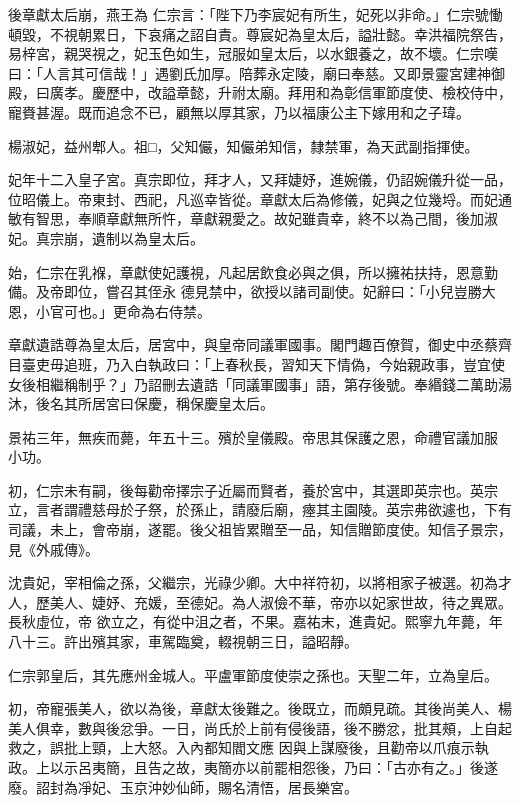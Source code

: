 \begin{pinyinscope}
 後章獻太后崩，燕王為
 仁宗言：「陛下乃李宸妃有所生，妃死以非命。」仁宗號慟頓毀，不視朝累日，下哀痛之詔自責。尊宸妃為皇太后，謚壯懿。幸洪福院祭告，易梓宮，親哭視之，妃玉色如生，冠服如皇太后，以水銀養之，故不壞。仁宗嘆曰：「人言其可信哉！」遇劉氏加厚。陪葬永定陵，廟曰奉慈。又即景靈宮建神御殿，曰廣孝。慶歷中，改謚章懿，升祔太廟。拜用和為彰信軍節度使、檢校侍中，寵賚甚渥。既而追念不已，顧無以厚其家，乃以福康公主下嫁用和之子瑋。



 楊淑妃，益州郫人。祖□，父知儼，知儼弟知信，隸禁軍，為天武副指揮使。



 妃年十二入皇子宮。真宗即位，拜才人，又拜婕妤，進婉儀，仍詔婉儀升從一品，位昭儀上。帝東封、西祀，凡巡幸皆從。章獻太后為修儀，妃與之位幾埒。而妃通敏有智思，奉順章獻無所忤，章獻親愛之。故妃雖貴幸，終不以為己間，後加淑妃。真宗崩，遺制以為皇太后。



 始，仁宗在乳褓，章獻使妃護視，凡起居飲食必與之俱，所以擁祐扶持，恩意勤備。及帝即位，嘗召其侄永
 德見禁中，欲授以諸司副使。妃辭曰：「小兒豈勝大恩，小官可也。」更命為右侍禁。



 章獻遺誥尊為皇太后，居宮中，與皇帝同議軍國事。閣門趣百僚賀，御史中丞蔡齊目臺吏毋追班，乃入白執政曰：「上春秋長，習知天下情偽，今始親政事，豈宜使女後相繼稱制乎？」乃詔刪去遺誥「同議軍國事」語，第存後號。奉緡錢二萬助湯沐，後名其所居宮曰保慶，稱保慶皇太后。



 景祐三年，無疾而薨，年五十三。殯於皇儀殿。帝思其保護之恩，命禮官議加服
 小功。



 初，仁宗未有嗣，後每勸帝擇宗子近屬而賢者，養於宮中，其選即英宗也。英宗立，言者謂禮慈母於子祭，於孫止，請廢后廟，瘞其主園陵。英宗弗欲遽也，下有司議，未上，會帝崩，遂罷。後父祖皆累贈至一品，知信贈節度使。知信子景宗，見《外戚傳》。



 沈貴妃，宰相倫之孫，父繼宗，光祿少卿。大中祥符初，以將相家子被選。初為才人，歷美人、婕妤、充媛，至德妃。為人淑儉不華，帝亦以妃家世故，待之異眾。長秋虛位，帝
 欲立之，有從中沮之者，不果。嘉祐末，進貴妃。熙寧九年薨，年八十三。許出殯其家，車駕臨奠，輟視朝三日，謚昭靜。



 仁宗郭皇后，其先應州金城人。平盧軍節度使崇之孫也。天聖二年，立為皇后。



 初，帝寵張美人，欲以為後，章獻太後難之。後既立，而頗見疏。其後尚美人、楊美人俱幸，數與後忿爭。一日，尚氏於上前有侵後語，後不勝忿，批其頰，上自起救之，誤批上頸，上大怒。入內都知閻文應
 因與上謀廢後，且勸帝以爪痕示執政。上以示呂夷簡，且告之故，夷簡亦以前罷相怨後，乃曰：「古亦有之。」後遂廢。詔封為凈妃、玉京沖妙仙師，賜名清悟，居長樂宮。




\end{pinyinscope}
